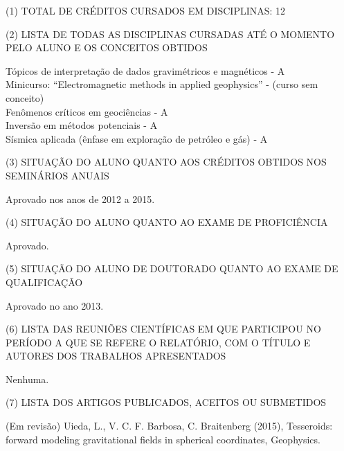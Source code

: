\documentclass[12pt,a4paper]{article}
\begin{document}
\vspace{1cm}

\begin{flushleft}

\noindent (1) TOTAL DE CRÉDITOS CURSADOS EM DISCIPLINAS: 12

\bigskip

\noindent (2) LISTA DE TODAS AS DISCIPLINAS CURSADAS ATÉ O MOMENTO PELO ALUNO
E OS CONCEITOS OBTIDOS

\bigskip

Tópicos de interpretação de dados gravimétricos e magnéticos - A\\
Minicurso: ``Electromagnetic methods in applied geophysics'' - (curso sem
conceito)\\
Fenômenos críticos em geociências - A\\
Inversão em métodos potenciais - A\\
Sísmica aplicada (ênfase em exploração de petróleo e gás) - A

\bigskip

\noindent (3) SITUAÇÃO DO ALUNO QUANTO AOS CRÉDITOS OBTIDOS NOS SEMINÁRIOS
ANUAIS

\bigskip

Aprovado nos anos de 2012 a 2015.

\bigskip

\noindent (4) SITUAÇÃO DO ALUNO QUANTO AO EXAME DE PROFICIÊNCIA

\bigskip

Aprovado.

\bigskip

\noindent (5) SITUAÇÃO DO ALUNO DE DOUTORADO QUANTO AO EXAME DE QUALIFICAÇÃO

\bigskip

Aprovado no ano 2013.

\bigskip

\noindent (6) LISTA DAS REUNIÕES CIENTÍFICAS EM QUE PARTICIPOU NO PERÍODO A QUE
SE REFERE O RELATÓRIO, COM O TÍTULO E AUTORES DOS TRABALHOS APRESENTADOS

\bigskip

Nenhuma.

\bigskip

\noindent (7) LISTA DOS ARTIGOS PUBLICADOS, ACEITOS OU SUBMETIDOS

\bigskip


(Em revisão) Uieda, L., V. C. F. Barbosa, C. Braitenberg (2015),
Tesseroids: forward modeling gravitational fields in spherical coordinates,
Geophysics.


\end{flushleft}
\end{document}
